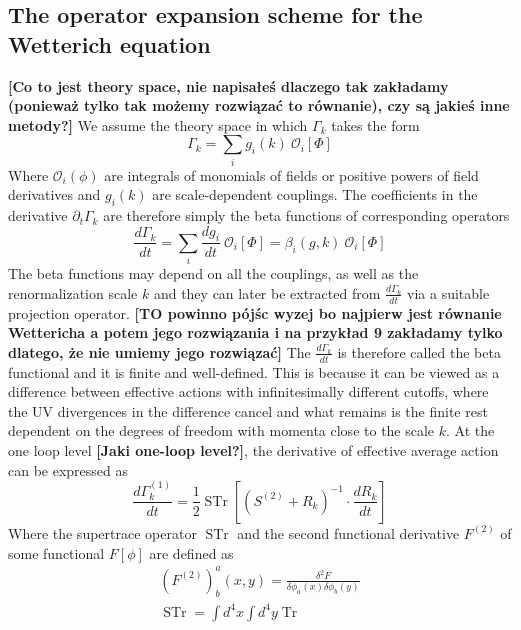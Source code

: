 \documentclass[11pt, a4paper]{article}
\newcommand{\jhkbf}[1]{\textbf{\color{red} [#1]}}
\begin{document}
\subsection{The operator expansion scheme for the Wetterich equation}
\jhkbf{Co to jest theory space, nie napisałeś dlaczego tak zakładamy (ponieważ tylko tak możemy rozwiązać to równanie), czy są jakieś inne metody?}
We assume the theory space in which $\Gamma_k$ takes the form
\begin{equation}
    \Gamma_k = \sum_i g_i(k) \ \mathcal{O}_i [\Phi]
    \label{gamma_decomp}
\end{equation}
Where $\mathcal{O}_i (\phi)$ are integrals of monomials of fields or positive powers of field derivatives 
and $g_i(k)$ are scale-dependent couplings.
The coefficients in the derivative $\partial_t \Gamma_k$ are therefore simply the beta functions of corresponding operators
\begin{equation}
    \frac{d \Gamma_k}{dt} = \sum_i \frac{d g_i}{dt} \ \mathcal{O}_i [\Phi] = \beta_i(g,k) \ \mathcal{O}_i [\Phi]
\end{equation}
The beta functions may depend on all the couplings, as well as the renormalization scale $k$ and
they can later be extracted from $\frac{d \Gamma_k}{dt}$ via a suitable projection operator. 
\jhkbf{TO powinno pójśc wyzej bo najpierw jest równanie Wettericha a potem jego rozwiązania i na przykład 9 zakładamy tylko dlatego, że nie umiemy jego rozwiązać}
The $\frac{d \Gamma_k}{dt}$ is therefore called the beta functional and it is finite and well-defined.
This is because it can be viewed as a difference between effective actions with infinitesimally
different cutoffs, where the UV divergences in the difference cancel and what remains is the finite rest
dependent on the degrees of freedom with momenta close to the scale $k$.
At the one loop level \jhkbf{Jaki one-loop level?}, the derivative of effective average action can be expressed as
\begin{equation}
    \frac{d \Gamma_k^{(1)}}{dt} = \frac{1}{2} \operatorname{STr} \left[ \left(S^{(2)} + R_k\right)^{-1} \cdot \frac{d R_k}{dt} \right]
    \label{1LEAA}
\end{equation}
Where the supertrace operator $ \operatorname{STr}$ and the second functional derivative $F^{(2)}$ of some functional $F[\phi]$ are defined as
\begin{gather}
    (F^{(2)})^a_b(x,y) = \frac{\delta^2 F}{\delta\phi_a(x)\delta\phi_b(y)}\\
    \operatorname{STr} = \int d^4 x \int d^4 y \operatorname{Tr}
\end{gather}
\end{document}
